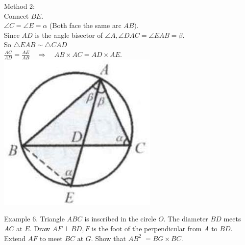 \documentclass[10pt]{article}
\begin{document}
Method 2:\\
Connect \(B E\).\\
\(\angle C=\angle E=\alpha\) (Both face the same arc \(A B)\).\\
Since \(A D\) is the angle bisector of \(\angle A, \angle D A C=\angle E A B=\beta\).\\
So \(\triangle E A B \sim \triangle C A D\)\\
\(\frac{A C}{A D}=\frac{A E}{A B} \quad \Rightarrow \quad A B \times A C=A D \times A E\).\\
\includegraphics[max width=\textwidth, center]{2025_04_17_97bc1f7e44d93c271a88g-165(3)}

Example 6. Triangle \(A B C\) is inscribed in the circle \(O\). The diameter \(B D\) meets \(A C\) at \(E\). Draw \(A F \perp B D, F\) is the foot of the perpendicular from \(A\) to \(B D\). Extend \(A F\) to meet \(B C\) at \(G\). Show that \(A B^{2}\) \(=B G \times B C\).
\end{document}
